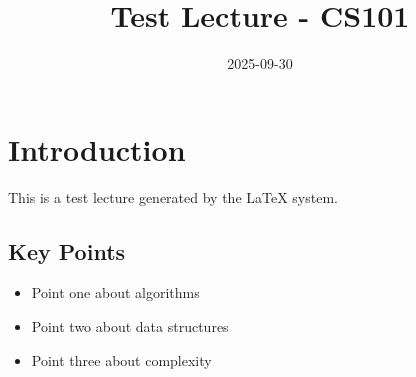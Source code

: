 \documentclass[11pt]{article}
\begin{document}
\title{Test Lecture - CS101}
\date{2025-09-30}
\maketitle

\section{Introduction}

This is a test lecture generated by the LaTeX system.

\subsection{Key Points}
\begin{itemize}
  \item Point one about algorithms
  \item Point two about data structures
  \item Point three about complexity
\end{itemize}
\end{document}
